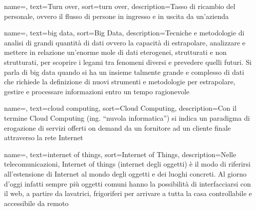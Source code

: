 
\renewcommand{\acronymname}{Acronimi e abbreviazioni}




{
    name=,
    text=Turn over,
    sort=turn over,
    description={Tasso di ricambio del personale, ovvero il flusso di persone in ingresso e in uscita da un'azienda}
}

{
    name=,
    text=big data,
    sort=Big Data,
    description={Tecniche e metodologie di analisi di grandi quantità di dati ovvero la capacità di estrapolare, analizzare e mettere in relazione un’enorme mole di dati eterogenei, strutturati e non strutturati, per scoprire i legami tra fenomeni diversi e prevedere quelli futuri. Si parla di big data quando si ha un insieme talmente grande e complesso di dati che richiede la definizione di nuovi strumenti e metodologie per estrapolare, gestire e processare informazioni entro un tempo ragionevole}
}

{
    name=,
    text=cloud computing,
    sort=Cloud Computing,
    description={Con il termine Cloud Computing (ing. “nuvola informatica”) si indica un
paradigma di erogazione di servizi offerti on demand da un fornitore ad un cliente finale
attraverso la rete Internet}
}

{
    name=,
    text=internet of things,
    sort=Internet of Things,
    description={Nelle telecomunicazioni, Internet of things (internet degli oggetti) è
il modo di riferirsi all’estensione di Internet al mondo degli oggetti e dei luoghi concreti.
Al giorno d’oggi infatti sempre più oggetti comuni hanno la possibilità di interfacciarsi
con il web, a partire da lavatrici, frigoriferi per arrivare a tutta la casa controllabile e
accessibile da remoto}
}

